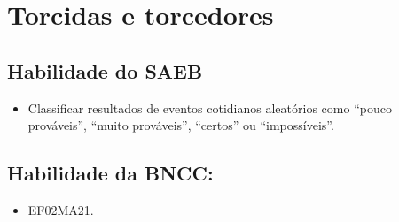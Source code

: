 \chapter{Torcidas e torcedores}


\section*{Habilidade do SAEB}

\begin{itemize}
\item Classificar resultados de eventos cotidianos aleatórios como ``pouco
prováveis'', ``muito prováveis'', ``certos'' ou ``impossíveis''.
\end{itemize}

\section*{Habilidade da BNCC:}

\begin{itemize}
\item EF02MA21.
\end{itemize}

